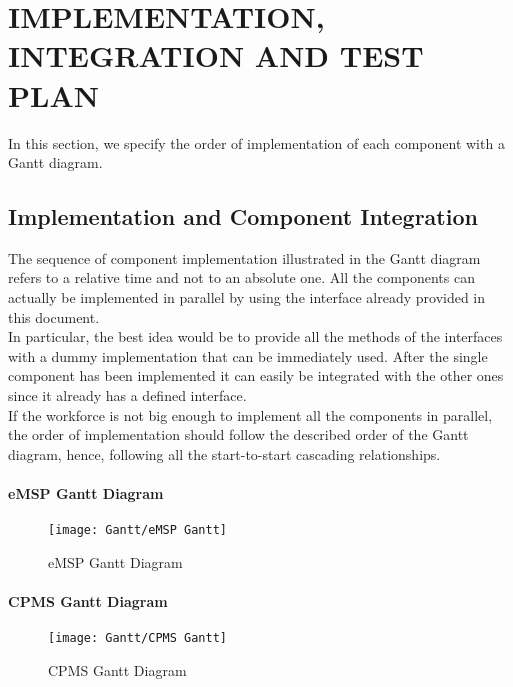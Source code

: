 \chapter{IMPLEMENTATION, INTEGRATION AND TEST PLAN}
\label{ch:IV}%
In this section, we specify the order of implementation of each component with a Gantt diagram.
\section{Implementation and Component Integration}
\label{sec:componentIntegration}%
The sequence of component implementation illustrated in the Gantt diagram refers to a relative time and not to an absolute one. All the components can actually be implemented in parallel by using the interface already provided in this document. \\
In particular, the best idea would be to provide all the methods of the interfaces with a dummy implementation that can be immediately used. After the single component has been implemented it can easily be integrated with the other ones since it already has a defined interface.\\
If the workforce is not big enough to implement all the components in parallel, the order of implementation should follow the described order of the Gantt diagram, hence, following all the start-to-start cascading relationships. 
\subsubsection{eMSP Gantt Diagram}
\begin{figure}[H]
    \begin{center}
    \texttt{[image: Gantt/eMSP Gantt]}
    \caption{eMSP Gantt Diagram}
    \label{fig:eMSPGantt}
    \end{center}
\end{figure}

\subsubsection{CPMS Gantt Diagram}
\begin{figure}[H]
    \begin{center}
    \texttt{[image: Gantt/CPMS Gantt]}
    \caption{CPMS Gantt Diagram}
    \label{fig:CPMSGantt}
    \end{center}
\end{figure}
\newpage
